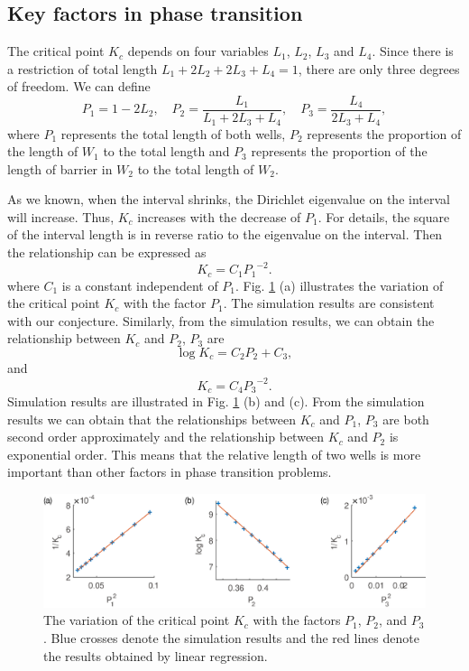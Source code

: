 \documentclass[a4paper,11pt]{article}
\begin{document}
\subsection{Key factors in phase transition}

The critical point $K_c$ depends on four variables $L_1$, $L_2$, $L_3$ and $L_4$. Since there is a restriction of total length $L_1 + 2 L_2 + 2 L_3 + L_4 = 1$, there are only three degrees of freedom. We can define 
\begin{equation}
P_1 = 1 - 2 L_2, \quad P_2 = \frac{L_1}{L_1 + 2 L_3 + L_4}, \quad P_3 = \frac{L_4}{2 L_3 + L_4},
\end{equation}
where $P_1$ represents the total length of both wells, $P_2$ represents the proportion of the length of $W_1$ to the total length and $P_3$ represents the proportion of the length of barrier in $W_2$ to the total length of $W_2$.

As we known, when the interval shrinks, the Dirichlet eigenvalue on the interval will increase. Thus, $K_c$ increases with the decrease of $P_1$. For details, the square of the interval length is in reverse ratio to the eigenvalue on the interval. Then the relationship can be expressed as
\begin{equation}
K_c = C_1 {P_1}^{-2}.
\end{equation}
where $C_1$ is a constant independent of $P_1$. Fig. \ref{fig6} (a) illustrates the variation of the critical point $K_c$ with the factor $P_1$. The simulation results are consistent with our conjecture. Similarly, from the simulation results, we can obtain the relationship between $K_c$ and $P_2$, $P_3$ are
\begin{equation}
\log K_c = C_2 P_2 + C_3,
\end{equation}
and
\begin{equation}
K_c = C_4 {P_3}^{-2}.
\end{equation}
Simulation results are illustrated in Fig. \ref{fig6} (b) and (c). From the simulation results we can obtain that the relationships between $K_c$ and $P_1$, $P_3$ are both second order approximately and the relationship between $K_c$ and $P_2$ is exponential order. This means that the relative length of two wells is more important than other factors in phase transition problems.

\begin{figure}
\centering
\includegraphics[width=\linewidth]{Fig6.eps}
\caption{The variation of the critical point $K_c$ with the factors $P_1$, $P_2$, and $P_3$. Blue crosses denote the simulation results and the red lines denote the results obtained by linear regression.}
\label{fig6}
\end{figure}
\end{document}
